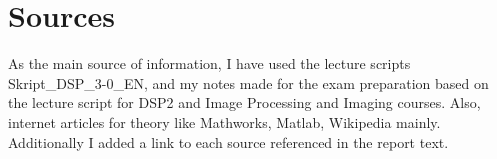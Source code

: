 \clearpage
\section{Sources}

As the main source of information, I have used the lecture scripts
Skript\_DSP\_3-0\_EN, and my notes made for the exam preparation based on
the lecture script for DSP2 and Image Processing and Imaging courses. Also, internet articles for theory like Mathworks, Matlab, Wikipedia mainly. Additionally I added a link to each source referenced in the report text.
